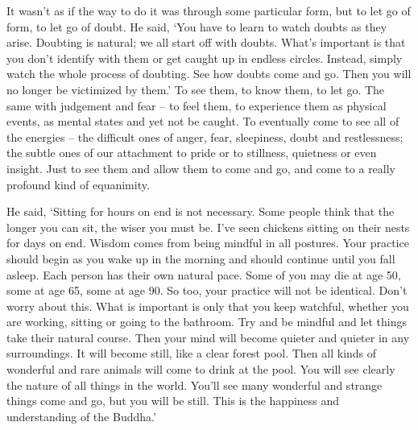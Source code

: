It wasn't as if the way to do it was through some particular form, but
to let go of form, to let go of doubt. He said, `You have to learn to
watch doubts as they arise. Doubting is natural; we all start off with
doubts. What's important is that you don't identify with them or get
caught up in endless circles. Instead, simply watch the whole process of
doubting. See how doubts come and go. Then you will no longer be
victimized by them.' To see them, to know them, to let go. The same with
judgement and fear -- to feel them, to experience them as physical
events, as mental states and yet not be caught. To eventually come to
see all of the energies -- the difficult ones of anger, fear, 
sleepiness, doubt and restlessness; the subtle ones of our attachment to
pride or to stillness, quietness or even insight. Just to see them and
allow them to come and go, and come to a really profound kind of
equanimity. 

He said, `Sitting for hours on end is not necessary. Some people think
that the longer you can sit, the wiser you must be. I've seen chickens
sitting on their nests for days on end. Wisdom comes from being mindful
in all postures. Your practice should begin as you wake up in the
morning and should continue until you fall asleep. Each person has their
own natural pace. Some of you may die at age 50, some at age 65, some at
age 90. So too, your practice will not be identical. Don't worry about
this. What is important is only that you keep watchful, whether you are
working, sitting or going to the bathroom. Try and be mindful and let
things take their natural course. Then your mind will become quieter and
quieter in any surroundings. It will become still, like a clear forest
pool. Then all kinds of wonderful and rare animals will come to drink at
the pool. You will see clearly the nature of all things in the world. 
You'll see many wonderful and strange things come and go, but you will
be still. This is the happiness and understanding of the Buddha.'

